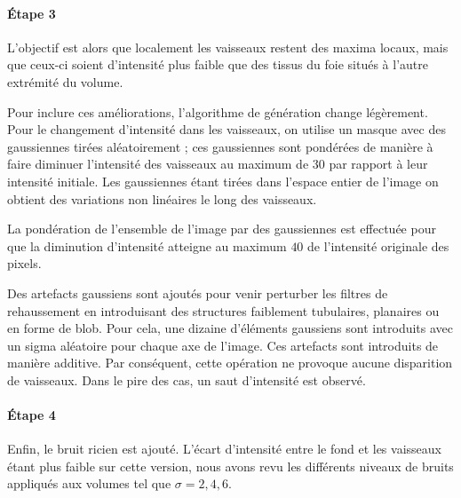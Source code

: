 \paragraph{Étape 3}

 L'objectif est alors que localement les vaisseaux restent des maxima locaux, mais que ceux-ci soient d'intensité plus faible que des tissus du foie situés à l'autre extrémité du volume.

Pour inclure ces améliorations, l'algorithme de génération change légèrement. Pour le changement d'intensité dans les vaisseaux, on utilise un masque avec des gaussiennes tirées aléatoirement ; ces gaussiennes sont pondérées de manière à faire diminuer l'intensité des vaisseaux au maximum de $30$ \percent{} par rapport à leur intensité initiale. Les gaussiennes étant tirées dans l'espace entier de l'image on obtient des variations non linéaires le long des vaisseaux.

La pondération de l'ensemble de l'image par des gaussiennes est effectuée pour que la diminution d'intensité atteigne au maximum $40$ \percent{} de l'intensité originale des pixels.

Des artefacts gaussiens sont ajoutés pour venir perturber les filtres de rehaussement en introduisant des structures faiblement tubulaires, planaires ou en forme de blob. Pour cela, une dizaine d'éléments gaussiens sont introduits avec un sigma aléatoire pour chaque axe de l'image. Ces artefacts sont introduits de manière additive. Par conséquent, cette opération ne provoque aucune disparition de vaisseaux. Dans le pire des cas, un saut d'intensité est observé.

\paragraph{Étape 4}
Enfin, le bruit ricien est ajouté. L'écart d'intensité entre le fond et les vaisseaux étant plus faible sur cette version, nous avons revu les différents niveaux de bruits appliqués aux volumes tel que $\sigma={2,4,6}$.

